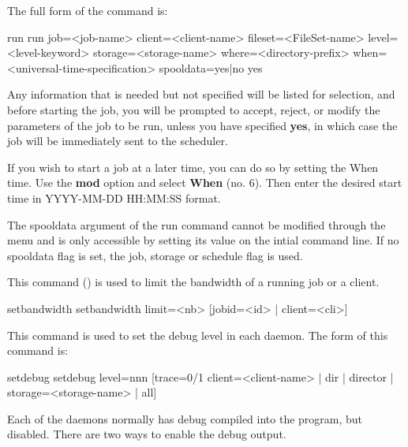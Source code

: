 \begin{description}
   The full form of the command is:

\begin{bconsole}{run}
run job=<job-name> client=<client-name>
  fileset=<FileSet-name>  level=<level-keyword>
  storage=<storage-name>  where=<directory-prefix>
  when=<universal-time-specification> spooldata=yes|no yes
\end{bconsole}

   Any information that is needed but not specified will be listed for
   selection, and before starting the job, you will be prompted to accept,
   reject, or modify the parameters of the job to be run, unless you have
   specified {\bf yes}, in which case the job will be immediately sent to
   the scheduler.

   If you wish to start a job at a later time, you can do so by setting  the When
   time. Use the {\bf mod} option and select {\bf When} (no. 6).  Then enter the
   desired start time in YYYY-MM-DD HH:MM:SS format.

   The spooldata argument of the run command cannot be modified through the menu
   and is only accessible by setting its value on the intial command line. If
   no spooldata flag is set, the job, storage or schedule flag is used.

\item[setbandwidth]
  This command () is used to limit the bandwidth of a running job or a client.

\begin{bconsole}{setbandwidth}
setbandwidth limit=<nb> [jobid=<id> | client=<cli>]
\end{bconsole}


\item [setdebug]
    \label{bcommandSetdebug}
   This command is used to set the debug level in each  daemon. The form of this
   command is:

\begin{bconsole}{setdebug}
setdebug level=nnn [trace=0/1 client=<client-name> | dir | director | storage=<storage-name> | all]
\end{bconsole}

   Each of the daemons normally has debug compiled into the program, but
   disabled. There are two ways to enable the debug output.


\end{description}
